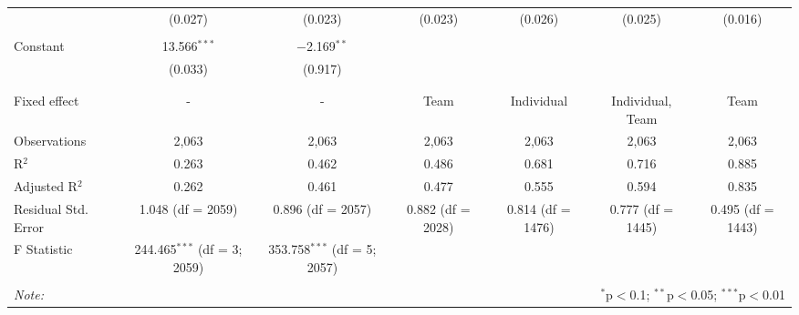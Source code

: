 \begin{table}[!htbp]
\begin{tabular}{@{\extracolsep{5pt}}lcccccc}
  & (0.027) & (0.023) & (0.023) & (0.026) & (0.025) & (0.016) \\
  & & & & & & \\
 Constant & 13.566$^{***}$ & $-$2.169$^{**}$ &  &  &  &  \\
  & (0.033) & (0.917) &  &  &  &  \\
  & & & & & & \\
\hline \\[-1.8ex]
Fixed effect & - & - & Team & Individual & Individual, Team & Team \\
Observations & 2,063 & 2,063 & 2,063 & 2,063 & 2,063 & 2,063 \\
R$^{2}$ & 0.263 & 0.462 & 0.486 & 0.681 & 0.716 & 0.885 \\
Adjusted R$^{2}$ & 0.262 & 0.461 & 0.477 & 0.555 & 0.594 & 0.835 \\
Residual Std. Error & 1.048 (df = 2059) & 0.896 (df = 2057) & 0.882 (df = 2028) & 0.814 (df = 1476) & 0.777 (df = 1445) & 0.495 (df = 1443) \\
F Statistic & 244.465$^{***}$ (df = 3; 2059) & 353.758$^{***}$ (df = 5; 2057) &  &  &  &  \\
\hline
\hline \\[-1.8ex]
\textit{Note:}  & \multicolumn{6}{r}{$^{*}$p$<$0.1; $^{**}$p$<$0.05; $^{***}$p$<$0.01} \\
\end{tabular}
\end{table}
